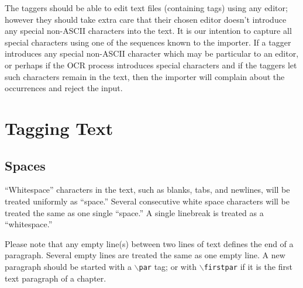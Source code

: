\documentclass[11pt]{article}
\newcommand{\cmd}[1]{{\tt $\backslash$#1}}
\begin{document}
The taggers should be able to edit text files (containing tags) using
any editor; however they should take extra care that their chosen
editor doesn't introduce any special non-ASCII characters into the
text. It is our intention to capture all special characters using one
of the sequences known to the importer. If a tagger introduces any
special non-ASCII character which may be particular to an editor, or
perhaps if the OCR process introduces special characters and if the
taggers let such characters remain in the text, then the importer will
complain about the occurrences and reject the input.

\section{Tagging Text}





\subsection{Spaces}

``Whitespace'' characters in the text, such as blanks, tabs, and
newlines, will be treated uniformly as ``space.'' Several consecutive
white space characters will be treated the same as one single ``space.''
A single linebreak is treated as a ``whitespace.''

Please note that any empty line(s) between two lines of text defines
the end of a paragraph. Several empty lines are treated the same as
one empty line. A new paragraph should be started with a \cmd{par}
tag; or with \cmd{firstpar} if it is the first text paragraph of a
chapter.



\end{document}
